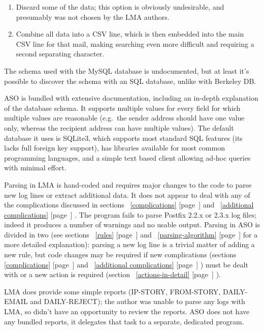 \documentclass[a4paper,12pt,draft]{article}
\newcommand{\parsername}{ASO}
\newcommand{\refwithpage}[1]{%
    \empty{}\ref{#1} [page~\pageref{#1}]%
}
\begin{document}
\begin{enumerate}

    \item Discard some of the data; this option is obviously undesirable,
        and presumably was not chosen by the LMA authors.

    \item Combine all data into a CSV line, which is then embedded into the
        main CSV line for that mail, making searching even more difficult
        and requiring a second separating character.

\end{enumerate}

The schema used with the MySQL database is undocumented, but at least it's
possible to discover the schema with an SQL database, unlike with Berkeley
DB\@.

\parsername{} is bundled with extensive documentation, including an
in-depth explanation of the database schema.  It supports multiple values
for every field for which multiple values are reasonable (e.g.\ the sender
address should have one value only, whereas the recipient address can have
multiple values).  The default database it uses is SQLite3, which supports
most standard SQL features (its lacks full foreign key support), has
libraries available for most common programming languages, and a simple
text based client allowing ad-hoc queries with minimal effort.

Parsing in LMA is hand-coded and requires major changes to the code to
parse new log lines or extract additional data.  It does not appear to deal
with any of the complications discussed in
sections~\refwithpage{complications} and~\refwithpage{additional
complications}.  The program fails to parse Postfix 2.2.x or 2.3.x log
files; indeed it produces a number of warnings and no usable output.
Parsing in \parsername{} is divided in two (see
sections~\refwithpage{rules} and~\refwithpage{parsing-algorithm} for a more
detailed explanation): parsing a new log line is a trivial matter of adding
a new rule, but code changes may be required if new complications
(sections~\refwithpage{complications} and~\refwithpage{additional
complications}) must be dealt with or a new action is required
(section~\refwithpage{actions-in-detail}).

LMA does provide some simple reports (IP-STORY, FROM-STORY, DAILY-EMAIL and
DAILY-REJECT); the author was unable to parse any logs with LMA, so didn't
have an opportunity to review the reports.  \parsername{} does not have any
bundled reports, it delegates that task to a separate, dedicated program.
\end{document}
